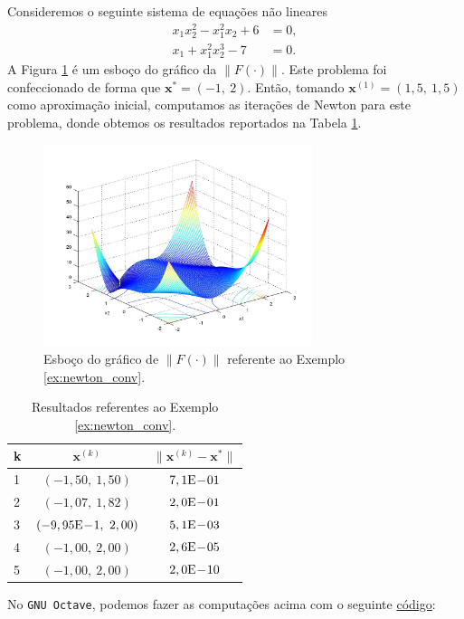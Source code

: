 \begin{ex}\label{ex:newton_conv}
  Consideremos o seguinte sistema de equações não lineares
  \begin{align}
    x_1x_2^2 - x_1^2x_2 + 6 &= 0,\\
    x_1 + x_1^2x_2^3 - 7 &= 0.
  \end{align}
  A Figura \ref{fig:ex_newton_conv} é um esboço do gráfico da $\|F(\cdot)\|$. Este problema foi confeccionado de forma que $\pmb{x}^* = (-1,~2)$. Então, tomando $\pmb{x}^{(1)} = (1,5,~1,5)$ como aproximação inicial, computamos as iterações de Newton para este problema, donde obtemos os resultados reportados na Tabela \ref{tab:ex_newton_conv}. 

  \begin{figure}[h!]
    \centering
    \includegraphics[width=0.7\textwidth]{./cap_snl/dados/ex_newton_conv/ex_newton_conv}
    \caption{Esboço do gráfico de $\|F(\cdot)\|$ referente ao Exemplo \ref{ex:newton_conv}.}
    \label{fig:ex_newton_conv}
  \end{figure}

  \begin{table}[h!]
    \centering
    \begin{tabular}{lcc}
      k & $\pmb{x}^{(k)}$ & $\|\pmb{x}^{(k)} - \pmb{x}^*\|$\\\hline
      1 & $(-1,50,~1,50)$ & $7,1\mathrm{E}\!-\!01$\\
      2 & $(-1,07,~1,82)$ & $2,0\mathrm{E}\!-\!01$\\
      3 & $(-9,95\mathrm{E}\!-\!1,~2,00)$ & $5,1\mathrm{E}\!-\!03$\\
      4 & $(-1,00,~2,00)$ & $2,6\mathrm{E}\!-\!05$ \\
      5 & $(-1,00,~2,00)$ & $2,0\mathrm{E}\!-\!10$ \\\hline
    \end{tabular}
    \caption{Resultados referentes ao Exemplo \ref{ex:newton_conv}.}
    \label{tab:ex_newton_conv}
  \end{table}

\ifisoctave
No \verb+GNU Octave+, podemos fazer as computações acima com o seguinte \href{https://github.com/phkonzen/notas/blob/master/src/MatematicaNumerica/cap_snl/dados/ex_newton_conv/ex_newton_conv.m}{código}:

\fi
\end{ex}

